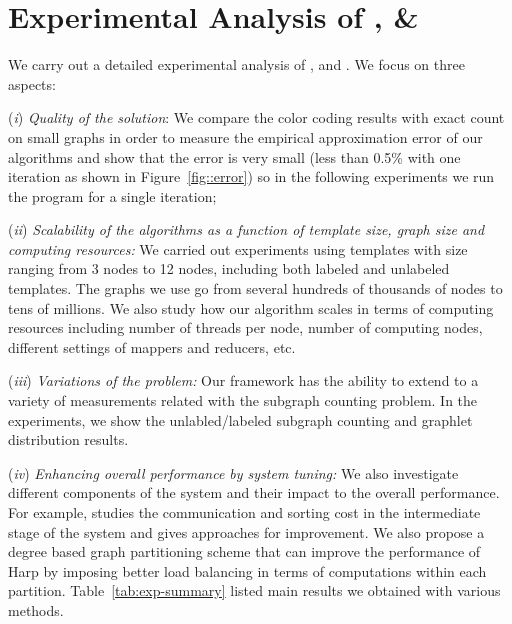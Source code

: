 \section{Experimental Analysis of \sahad{}, \ensahad{} \& \harpsahad{}}
\label{sec:experiment}

We carry out a detailed experimental analysis of  \sahad{}, \ensahad{} and
\harpsahad{}. We focus on three aspects:

({\it i}) \emph{Quality of the solution}:
We compare the color coding results with exact count on small graphs in order to
measure the empirical approximation error of our algorithms and show that the
error is very small (less than 0.5\% with one iteration as shown in
Figure~\ref{fig::error}) so in the following experiments we run the program for
a single iteration;

({\it ii}) \emph{Scalability of the algorithms as a function of
template size, graph size and computing resources:}
We carried out experiments using templates with size ranging from 3 nodes to 12
nodes, including both labeled and unlabeled templates. The graphs we use go from
several hundreds of thousands of nodes to tens of millions. We also study how
our algorithm scales in terms of computing resources including number of threads
per node, number of computing nodes, different settings of mappers and reducers,
etc.

({\it iii}) \emph{Variations of the problem:}
Our framework has the ability to extend to a variety of measurements related
with the subgraph counting problem. In the experiments, we show the
unlabled/labeled subgraph counting and graphlet distribution results.

({\it iv}) \emph{Enhancing overall performance by system tuning:}
We also investigate different components of the system and their impact to the
overall performance. For example, \ensahad{} studies the communication and
sorting cost in the intermediate stage of the system and gives approaches for
improvement. We also propose a degree based graph partitioning scheme that can
improve the performance of Harp by imposing better load balancing in terms of
computations within each partition.  Table~\ref{tab:exp-summary} listed main
results we obtained with various methods.

\begin{table}[hptb]
	\caption{Comparison on \sahad{}, \ensahad{} and \harpsahad{}}
\label{tab:exp-summary}
\end{table}


